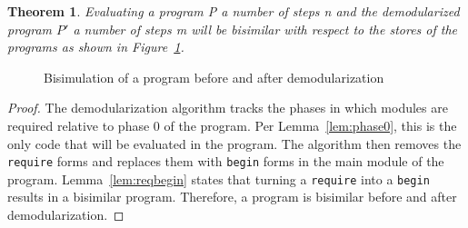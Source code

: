 \newtheorem*{theorem}{Theorem}
\begin{theorem}
Evaluating a program P a number of steps n and the demodularized program $P'$ a number of steps m will be bisimilar with respect to the stores of the programs as shown in Figure~\ref{fig:bisim.tex}.
\end{theorem}

\begin{figure}[h]
  \centering
  
  \caption{Bisimulation of a program before and after demodularization}
  \label{fig:bisim.tex}
\end{figure}


\begin{proof}
  The demodularization algorithm tracks the phases in which modules are required relative to phase 0 of the program.
  Per Lemma~\ref{lem:phase0}, this is the only code that will be evaluated in the program. 
  The algorithm then removes the \texttt{require} forms and replaces them with \texttt{begin} forms in the main module of the program. 
  Lemma~\ref{lem:reqbegin} states that turning a \texttt{require} into a \texttt{begin} results in a bisimilar program.
  Therefore, a program is bisimilar before and after demodularization. 
\end{proof}


